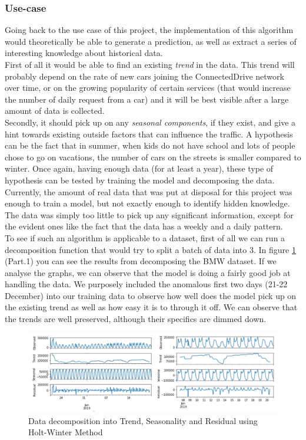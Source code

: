 \subsubsection{Use-case}
Going back to the use case of this project, the implementation of this algorithm would theoretically  be able to generate a prediction, as well as extract a series of interesting knowledge about historical data. \\
First of all it would be able to find an existing \textit{trend} in the data. This trend will probably depend on the rate of new cars joining  the ConnectedDrive network over time, or on the growing popularity of certain services (that would increase the number of daily request from a car) and it will be best visible after a large amount of data is collected. \\
Secondly, it should pick up on any \textit{seasonal components}, if they exist, and give a hint towards existing outside factors that can influence the traffic. A hypothesis can be the fact that in summer, when kids do not have school and lots of people chose to go on vacations, the number of cars on the streets is smaller compared to winter. Once again, having enough data (for at least a year), these type of hypothesis can be tested by training the model and decomposing the data.\\

Currently, the amount of real data that was put at disposal for this project was enough to train a model, but not exactly enough to identify hidden knowledge. The data was simply too little to pick up any significant information, except for the evident ones like the fact that the data has a weekly and a daily pattern. \\

To see if such an algorithm is applicable to a dataset, first of all we can run a decomposition function that would try to split a batch of data into 3. In figure \ref{fig:holt_winter_decomposition} (Part.1) you can see the results from decomposing the BMW dataset. If we analyse the graphs, we can observe that the model is doing a fairly good job at handling the data. We purposely included the anomalous first two days (21-22 December) into our training data to observe how well does the model pick up on the existing trend as well as how easy it is to through it off. We can observe that the trends are well preserved, although their specifics are dimmed down.\\
\begin{figure}[h]
    \includegraphics[width=1\textwidth]{images/holt-winter-decomposition.png}
    \caption{Data decomposition into Trend, Seasonality and Residual using Holt-Winter Method }
    \label{fig:holt_winter_decomposition}
\end{figure}

